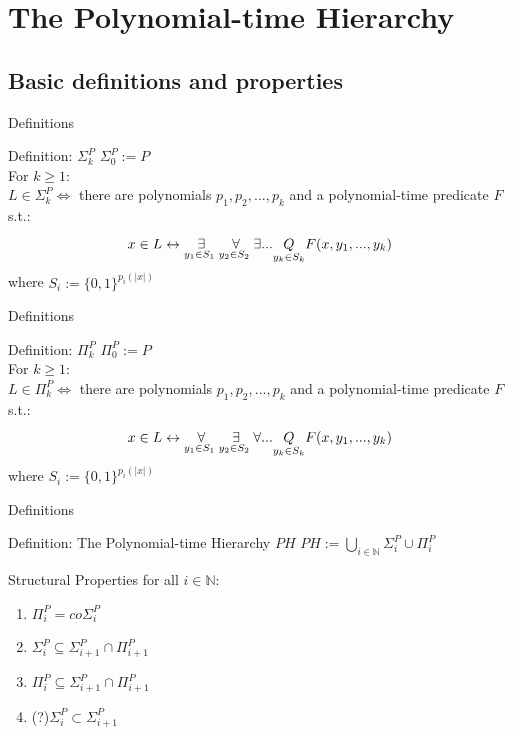 \section{The Polynomial-time Hierarchy}
    \subsection{Basic definitions and properties}
        \begin{frame}{Definitions}
            \begin{block}{Definition: $\Sigma_k^P$}
                $ \Sigma_0^P := P$\\
                For $k\geq 1:$ \\
                $L \in \Sigma_k^P \iff $ there are polynomials $p_1, p_2,..., p_k$ and a polynomial-time predicate $F$ s.t.:
                $$x \in L \leftrightarrow 
                    \overset{{}}{\underset{{y_1 \in S_1\text{ }}}{\Large \exists}}
                    \overset{{}}{\underset{{y_2 \in S_2\text{ }}}{\Large \forall}}
                    \exists ...\underset{y_k \in S_k}{Q} F(x,y_1,...,y_k)$$
                where $S_i := \{0,1\}^{p_i(|x|)}$  
            \end{block}
        \end{frame}
        \begin{frame}{Definitions}
            \begin{block}{Definition: $\Pi_k^P$}
                $ \Pi_0^P := P$\\
                For $k\geq 1:$ \\
                $L \in \Pi_k^P \iff $ there are polynomials $p_1, p_2,..., p_k$ and a polynomial-time predicate $F$ s.t.:
                $$x \in L \leftrightarrow 
                    \overset{{}}{\underset{{y_1 \in S_1\text{ }}}{\Large \forall}}
                    \overset{{}}{\underset{{y_2 \in S_2\text{ }}}{\Large \exists}}
                    \forall ...\underset{y_k \in S_k}{Q} F(x,y_1,...,y_k)$$
                where $S_i := \{0,1\}^{p_i(|x|)}$  
            \end{block}
        \end{frame}

        \begin{frame}{Definitions}
            \begin{block}{Definition: The Polynomial-time Hierarchy $PH$}
            $PH := \bigcup\limits_{i \in \mathbb{N}} \Sigma_i^P \cup \Pi_i^P $
            \end{block}
        \end{frame}
    
        \begin{frame}{Structural Properties}  
            for all $i\in \mathbb{N}$: 
            \begin{enumerate}
                \item $\Pi_i^P = co\Sigma_i^P $
                \pause
                \item $\Sigma_i^P \subseteq \Sigma_{i+1}^P \cap \Pi_{i+1}^P$
                \item $\Pi_i^P \subseteq \Sigma_{i+1}^P \cap \Pi_{i+1}^P$
                \pause
                \item (?)$\Sigma_i^P \subset \Sigma_{i+1}^P$
            \end{enumerate}
        \end{frame}

